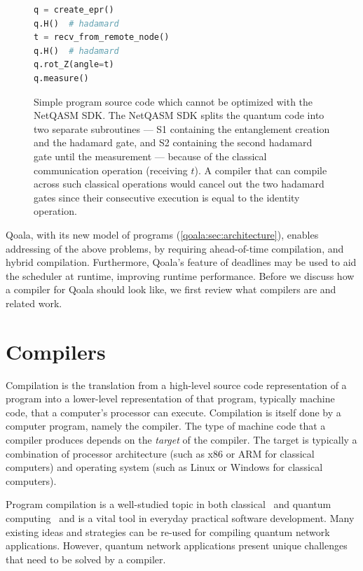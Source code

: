 \begin{figure}[t]
  \centering
  \begin{lstlisting}[language=Python]
q = create_epr()
q.H()  # hadamard
t = recv_from_remote_node()
q.H()  # hadamard
q.rot_Z(angle=t)
q.measure()
  \end{lstlisting}
  \caption{Simple program source code which cannot be optimized with the NetQASM SDK.
    The NetQASM SDK splits the quantum code into two separate subroutines ---
    S1 containing the entanglement creation and the hadamard gate, and
    S2 containing the second hadamard gate until the measurement ---
    because of the classical communication operation (receiving $t$).
    A compiler that can compile across such classical operations would cancel out the two hadamard gates since their consecutive execution is equal to the identity operation.
  }
  \label{compiler:lst:hybrid}
\end{figure}


Qoala, with its new model of programs (\cref{qoala:sec:architecture}), enables addressing of the above problems, by requiring ahead-of-time compilation, and hybrid compilation.
Furthermore, Qoala's feature of deadlines may be used to aid the scheduler at runtime, improving runtime performance.
Before we discuss how a compiler for Qoala should look like, we first review what compilers are and related work.


\section{Compilers}
Compilation is the translation from a high-level source code representation of a program into a lower-level representation of that program, typically machine code, that a computer's processor can execute.
Compilation is itself done by a computer program, namely the compiler.
The type of machine code that a compiler produces depends on the \emph{target} of the compiler.
The target is typically a combination of processor architecture (such as x86 or ARM for classical computers) and operating system (such as Linux or Windows for classical computers).

Program compilation is a well-studied topic in both classical~\cite{aho_compilers_2006} and quantum computing~\cite{chong_programming_2017} and is a vital tool in everyday practical software development.
Many existing ideas and strategies can be re-used for compiling quantum network applications.
However, quantum network applications present unique challenges that need to be solved by a compiler.

